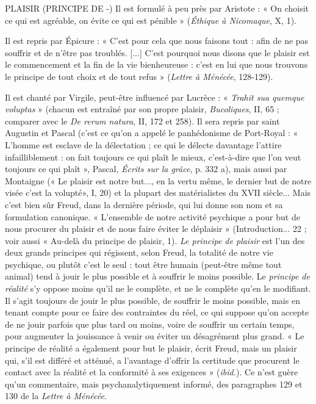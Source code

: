 PLAISIR (PRINCIPE DE -) Il est formulé à peu près par Aristote : « On
choisit ce qui est agréable, on évite ce qui est
pénible » ({\it Éthique à Nicomaque}, X, 1).

Il est repris par Épicure : « C’est pour cela que nous faisons tout : afin de
ne pas souffrir et de n’être pas troublés. [...] C’est pourquoi nous disons que le
plaisir est le commencement et la fin de la vie bienheureuse : c’est en lui que
nous trouvons le principe de tout choix et de tout refus » ({\it Lettre à Ménécée},
128-129).

Il est chanté par Virgile, peut-être influencé par Lucrèce : « {\it Trahit sua
quemque voluptas} » (chacun est entraîné par son propre plaisir, {\it Bucoliques}, II,
65 ; comparer avec le {\it De rerum natura}, II, 172 et 258). Il sera repris par saint
Augustin et Pascal (c’est ce qu’on a appelé le panhédonisme de Port-Royal :
« L'homme est esclave de la délectation ; ce qui le délecte davantage l’attire
infailliblement : on fait toujours ce qui plaît le mieux, c’est-à-dire que l’on
veut toujours ce qui plaît », Pascal, {\it Écrits sur la grâce}, p. 332 a), mais aussi par
Montaigne (« Le plaisir est notre but..., en la vertu même, le dernier but de
notre visée c’est la volupté», I, 20) et la plupart des matérialistes du
XVII siècle... Mais c’est bien sûr Freud, dans la dernière période, qui lui
donne son nom et sa formulation canonique. « L'ensemble de notre activité
psychique a pour but de nous procurer du plaisir et de nous faire éviter le
déplaisir » (Introduction... 22 ; voir aussi « Au-delà du principe de plaisir,
1). {\it Le principe de plaisir} est l’un des deux grands principes qui régissent, selon
Freud, la totalité de notre vie psychique, ou plutôt c’est le seul : tout être
humain (peut-être même tout animal) tend à jouir le plus possible et à souffrir
le moins possible. Le {\it principe de réalité} s'y oppose moins qu’il ne le complète,
et ne le complète qu’en le modifiant. Il s’agit toujours de jouir le plus
possible, de souffrir le moins possible, mais en tenant compte pour ce faire
des contraintes du réel, ce qui suppose qu’on accepte de ne jouir parfois que
plus tard ou moins, voire de souffrir un certain temps, pour augmenter la
jouissance à venir ou éviter un désagrément plus grand. « Le principe de réalité
a également pour but le plaisir, écrit Freud, mais un plaisir qui, s’il est
différé et atténué, a l'avantage d’offrir la certitude que procurent le contact
avec la réalité et la conformité à ses exigences » ({\it ibid.}). Ce n’est guère qu’un
commentaire, mais psychanalytiquement informé, des paragraphes 129
et 130 de la {\it Lettre à Ménécée}.

